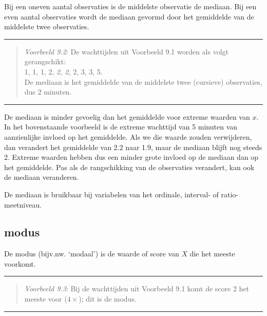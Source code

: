\documentclass[
]{book}
\begin{document}
Bij een oneven aantal observaties is de middelste observatie de mediaan.
Bij een even aantal observaties wordt de mediaan gevormd door het
gemiddelde van de middelste twee observaties.

\begin{center}\rule{0.5\linewidth}{0.5pt}\end{center}

\begin{quote}
\emph{Voorbeeld 9.2}: De wachttijden uit Voorbeeld 9.1
worden als volgt gerangschikt:\\
1, 1, 1, 2, \emph{2, 2}, 2, 3, 3, 5.\\
De mediaan is het gemiddelde van de middelste twee (cursieve)
observaties, dus 2 minuten.
\end{quote}

\begin{center}\rule{0.5\linewidth}{0.5pt}\end{center}

De mediaan is minder gevoelig dan het gemiddelde voor extreme waarden
van \(x\). In het bovenstaande voorbeeld is de extreme wachttijd van 5
minuten van aanzienlijke invloed op het gemiddelde. Als we die waarde
zouden verwijderen, dan verandert het gemiddelde van 2.2 naar 1.9, maar
de mediaan blijft nog steeds 2. Extreme waarden hebben dus een minder
grote invloed op de mediaan dan op het gemiddelde. Pas als de
rangschikking van de observaties verandert, kan ook de mediaan
veranderen.

De mediaan is bruikbaar bij variabelen van het ordinale, interval- of
ratio-meetniveau.

\subsection{modus}\label{modus}

De modus (bijv.nw. `modaal') is de waarde of score van \(X\) die het
meeste voorkomt.

\begin{center}\rule{0.5\linewidth}{0.5pt}\end{center}

\begin{quote}
\emph{Voorbeeld 9.3}: Bij de wachttijden uit Voorbeeld 9.1
komt de score 2 het meeste voor
(\(4\times\)); dit is de modus.
\end{quote}

\begin{center}\rule{0.5\linewidth}{0.5pt}\end{center}
\end{document}
